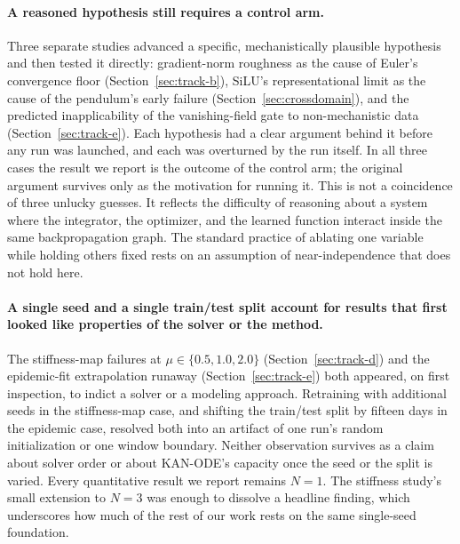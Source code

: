 \paragraph{A reasoned hypothesis still requires a control arm.} Three separate
studies advanced a specific, mechanistically plausible hypothesis and then
tested it directly: gradient-norm roughness as the cause of Euler's
convergence floor (Section~\ref{sec:track-b}), SiLU's representational limit
as the cause of the pendulum's early failure (Section~\ref{sec:crossdomain}),
and the predicted inapplicability of the vanishing-field gate to
non-mechanistic data (Section~\ref{sec:track-e}). Each hypothesis had a clear
argument behind it before any run was launched, and each was overturned by
the run itself. In all three cases the result we report is the outcome of
the control arm; the original argument survives only as the motivation for
running it. This is not a coincidence of three unlucky guesses. It reflects
the difficulty of reasoning about a system where the integrator, the
optimizer, and the learned function interact inside the same backpropagation
graph. The standard practice of ablating one variable while holding others
fixed rests on an assumption of near-independence that does not hold here.

\paragraph{A single seed and a single train/test split account for results
that first looked like properties of the solver or the method.} The
stiffness-map failures at $\mu\in\{0.5,1.0,2.0\}$ (Section~\ref{sec:track-d})
and the epidemic-fit extrapolation runaway (Section~\ref{sec:track-e}) both
appeared, on first inspection, to indict a solver or a modeling approach.
Retraining with additional seeds in the stiffness-map case, and shifting the
train/test split by fifteen days in the epidemic case, resolved both into an
artifact of one run's random initialization or one window boundary. Neither
observation survives as a claim about solver order or about KAN-ODE's
capacity once the seed or the split is varied. Every quantitative result we
report remains $N=1$. The stiffness study's small extension to $N=3$ was
enough to dissolve a headline finding, which underscores how much of the
rest of our work rests on the same single-seed foundation.

